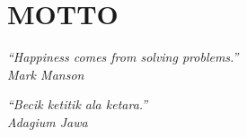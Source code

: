 \chapter*{MOTTO}

\begin{center}
\textit{
``Happiness comes from solving problems.''\\
Mark Manson
}

\textit{
``Becik ketitik ala ketara.''\\
Adagium Jawa
}
\end{center}

\newpage

